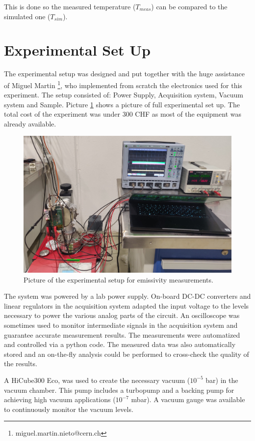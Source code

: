 This is done so the measured temperature ($T_{meas}$) can be compared to the simulated one ($T_{sim}$).

\section{Experimental Set Up}
\label{sec:ExpSetup}

The experimental setup was designed and put together with the huge assistance of Miguel Martin \footnote{miguel.martin.nieto@cern.ch}, who implemented from scratch the electronics used for this experiment. The setup consisted of: Power Supply, Acquisition system, Vacuum system and Sample. Picture \ref{fig:ExperimentalSetUp} shows a picture of full experimental set up. The total cost of the experiment was under 300 CHF as most of the equipment was already available. 

\begin{figure}[h]
    \centering
    \includegraphics[width=0.65\columnwidth]{ExperimentalSetUp/ExperimentalSetUp.jpg}
    \caption{Picture of the experimental setup for emissivity measurements.}
    \label{fig:ExperimentalSetUp}
\end{figure}

The system was powered by a lab power supply. On-board DC-DC converters and linear regulators in the acquisition system adapted the input voltage to the levels necessary to power the various analog parts of the circuit. An oscilloscope was sometimes used to monitor intermediate signals in the acquisition system and guarantee accurate measurement results. The measurements were automatized and controlled via a python code. The measured data was also automatically stored and an on-the-fly analysis could be performed to cross-check the quality of the results. 

A HiCube300 Eco, was used to create the necessary vacuum ($10^{-5}$ bar) in the vacuum chamber. This pump includes a turbopump and a backing pump for achieving high vacuum applications ($10^{-7}$ mbar). A vacuum gauge was available to continuously monitor the vacuum levels. 

